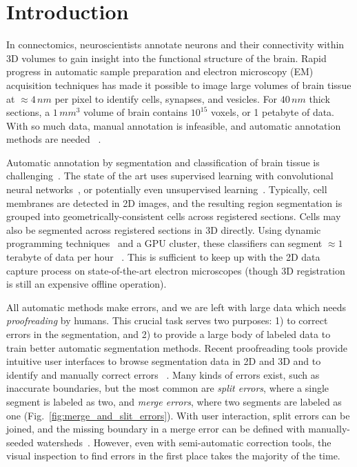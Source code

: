 \section{Introduction}

In connectomics, neuroscientists annotate neurons and their connectivity within 3D volumes to gain insight into the functional structure of the brain. Rapid progress in automatic sample preparation and electron microscopy (EM) acquisition techniques has made it possible to image large volumes of brain tissue at $\approx4\, nm$ per pixel to identify cells, synapses, and vesicles. For $40\, nm$ thick sections, a $1\, mm^3$ volume of brain contains $10^{15}$ voxels, or 1 petabyte of data. With so much data, manual annotation is infeasible, and automatic annotation methods are needed ~\cite{jain2010,Liu2014,GALA2014,kaynig2015large}.

Automatic annotation by segmentation and classification of brain tissue is challenging~\cite{isbi_challenge}. The state of the art uses supervised learning with convolutional neural networks~\cite{Ciresan:2012f}, or potentially even unsupervised learning~\cite{BogovicHJ13}. Typically, cell membranes are detected in 2D images, and the resulting region segmentation is grouped into geometrically-consistent cells across registered sections. Cells may also be segmented across registered sections in 3D directly. Using dynamic programming techniques~\cite{Masci:2013a} and a GPU cluster, these classifiers can segment $\approx1$ terabyte of data per hour ~\cite{kasthuri2015saturated}. This is sufficient to keep up with the 2D data capture process on state-of-the-art electron microscopes (though 3D registration is still an expensive offline operation).

All automatic methods make errors, and we are left with large data which needs \emph{proofreading} by humans. This crucial task serves two purposes: 1) to correct errors in the segmentation, and 2) to provide a large body of labeled data to train better automatic segmentation methods. Recent proofreading tools provide intuitive user interfaces to browse segmentation data in 2D and 3D and to identify and manually correct errors ~\cite{markus_proofreading,raveler,mojo2,haehn_dojo_2014}. Many kinds of errors exist, such as inaccurate boundaries, but the most common are \emph{split errors}, where a single segment is labeled as two, and \emph{merge errors}, where two segments are labeled as one (Fig.~\ref{fig:merge_and_slit_errors}). With user interaction, split errors can be joined, and the missing boundary in a merge error can be defined with manually-seeded watersheds~\cite{haehn_dojo_2014}. However, even with semi-automatic correction tools, the visual inspection to find errors in the first place takes the majority of the time.

